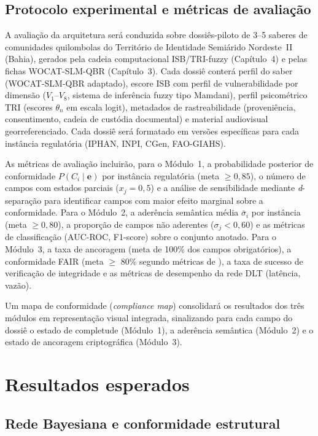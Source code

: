 \subsection{Protocolo experimental e métricas de avaliação}
\label{subsec:protocol_cap5}

A avaliação da arquitetura será conduzida sobre dossiês-piloto de 3--5 saberes de comunidades quilombolas do Território de Identidade Semiárido Nordeste~II (Bahia), gerados pela cadeia computacional ISB/TRI-fuzzy (Capítulo~4) e pelas fichas WOCAT-SLM-QBR (Capítulo~3). Cada dossiê conterá perfil do saber (WOCAT-SLM-QBR adaptado), escore ISB com perfil de vulnerabilidade por dimensão ($V_1$--$V_8$, sistema de inferência fuzzy tipo Mamdani), perfil psicométrico TRI (escores $\theta_n$ em escala logit), metadados de rastreabilidade (proveniência, consentimento, cadeia de custódia documental) e material audiovisual georreferenciado. Cada dossiê será formatado em versões específicas para cada instância regulatória (IPHAN, INPI, CGen, FAO-GIAHS).

As métricas de avaliação incluirão, para o Módulo~1, a probabilidade posterior de conformidade $P(C_i \mid \mathbf{e})$ por instância regulatória (meta $\geq 0{,}85$), o número de campos com estados parciais ($x_j = 0{,}5$) e a análise de sensibilidade mediante \textit{d}-separação para identificar campos com maior efeito marginal sobre a conformidade. Para o Módulo~2, a aderência semântica média $\bar{\sigma}_i$ por instância (meta $\geq 0{,}80$), a proporção de campos não aderentes ($\sigma_j < 0{,}60$) e as métricas de classificação (AUC-ROC, F1-score) sobre o conjunto anotado. Para o Módulo~3, a taxa de ancoragem (meta de 100\% dos campos obrigatórios), a conformidade FAIR (meta $\geq$ 80\% segundo métricas de ), a taxa de sucesso de verificação de integridade e as métricas de desempenho da rede DLT (latência, vazão).

Um mapa de conformidade (\textit{compliance map}) consolidará os resultados dos três módulos em representação visual integrada, sinalizando para cada campo do dossiê o estado de completude (Módulo~1), a aderência semântica (Módulo~2) e o estado de ancoragem criptográfica (Módulo~3).


\section{Resultados esperados}

\subsection{Rede Bayesiana e conformidade estrutural}
\label{subsec:res_bayes_cap5}

